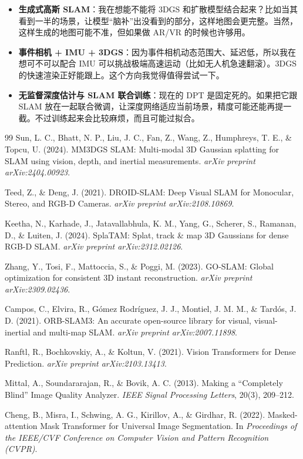 \documentclass[12pt,a4paper,onecolumn]{article}
\begin{document}
\begin{itemize}
    \item \textbf{生成式高斯 SLAM}：我在想能不能将 3DGS 和扩散模型结合起来？比如当其看到一半的场景，让模型“脑补”出没看到的部分，这样地图会更完整。当然，这样生成的地图可能不准，但如果做 AR/VR 的时候也许够用。

    \item \textbf{事件相机 + IMU + 3DGS}：因为事件相机动态范围大、延迟低，所以我在想可不可以配合 IMU 可以挑战极端高速运动（比如无人机急速翻滚）。3DGS 的快速渲染正好能跟上。这个方向我觉得值得尝试一下。

    \item \textbf{无监督深度估计与 SLAM 联合训练}：现在的 DPT \cite{DPT} 是固定死的。如果把它跟 SLAM 放在一起联合微调，让深度网络适应当前场景，精度可能还能再提一截。不过训练起来会比较麻烦，而且可能过拟合。
\end{itemize}

\begin{thebibliography}{99}
Sun, L. C., Bhatt, N. P., Liu, J. C., Fan, Z., Wang, Z., Humphreys, T. E., \& Topcu, U. (2024).
\newblock MM3DGS SLAM: Multi-modal 3D Gaussian splatting for SLAM using vision, depth, and inertial measurements.
\newblock \emph{arXiv preprint arXiv:2404.00923}.

Teed, Z., \& Deng, J. (2021).
\newblock DROID-SLAM: Deep Visual SLAM for Monocular, Stereo, and RGB-D Cameras.
\newblock \emph{arXiv preprint arXiv:2108.10869}.

Keetha, N., Karhade, J., Jatavallabhula, K. M., Yang, G., Scherer, S., Ramanan, D., \& Luiten, J. (2024).
\newblock SplaTAM: Splat, track \& map 3D Gaussians for dense RGB-D SLAM.
\newblock \emph{arXiv preprint arXiv:2312.02126}.

Zhang, Y., Tosi, F., Mattoccia, S., \& Poggi, M. (2023).
\newblock GO-SLAM: Global optimization for consistent 3D instant reconstruction.
\newblock \emph{arXiv preprint arXiv:2309.02436}.

Campos, C., Elvira, R., Gómez Rodríguez, J. J., Montiel, J. M. M., \& Tardós, J. D. (2021).
\newblock ORB-SLAM3: An accurate open-source library for visual, visual-inertial and multi-map SLAM.
\newblock \emph{arXiv preprint arXiv:2007.11898}.

Ranftl, R., Bochkovskiy, A., \& Koltun, V. (2021).
\newblock Vision Transformers for Dense Prediction.
\newblock \emph{arXiv preprint arXiv:2103.13413}.

Mittal, A., Soundararajan, R., \& Bovik, A. C. (2013).
\newblock Making a ``Completely Blind'' Image Quality Analyzer.
\newblock \emph{IEEE Signal Processing Letters}, 20(3), 209--212.

Cheng, B., Misra, I., Schwing, A. G., Kirillov, A., \& Girdhar, R. (2022).
\newblock Masked-attention Mask Transformer for Universal Image Segmentation.
\newblock In \emph{Proceedings of the IEEE/CVF Conference on Computer Vision and Pattern Recognition (CVPR)}.

\end{thebibliography}
\end{document}
